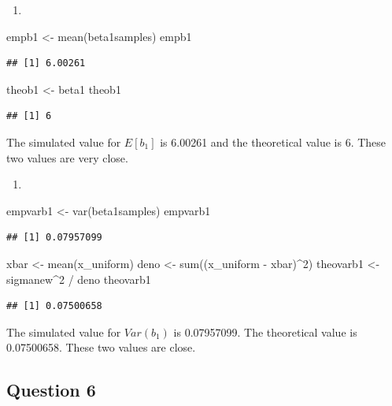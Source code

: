 \documentclass[
]{article}
\newenvironment{Shaded}{\begin{snugshade}}{\end{snugshade}}
\newcommand{\DecValTok}[1]{\textcolor[rgb]{0.00,0.00,0.81}{#1}}
\newcommand{\FunctionTok}[1]{\textcolor[rgb]{0.00,0.00,0.00}{#1}}
\newcommand{\NormalTok}[1]{#1}
\newcommand{\OtherTok}[1]{\textcolor[rgb]{0.56,0.35,0.01}{#1}}
\newcommand{\SpecialCharTok}[1]{\textcolor[rgb]{0.00,0.00,0.00}{#1}}
\providecommand{\tightlist}{%
  \setlength{\itemsep}{0pt}\setlength{\parskip}{0pt}}
\begin{document}
\begin{enumerate}
\def\labelenumi{\alph{enumi}.}
\setcounter{enumi}{1}
\tightlist
\item
\end{enumerate}

\begin{Shaded}
\begin{Highlighting}[]
\NormalTok{empb1 }\OtherTok{\textless{}{-}} \FunctionTok{mean}\NormalTok{(beta1samples)}
\NormalTok{empb1}
\end{Highlighting}
\end{Shaded}

\begin{verbatim}
## [1] 6.00261
\end{verbatim}

\begin{Shaded}
\begin{Highlighting}[]
\NormalTok{theob1 }\OtherTok{\textless{}{-}}\NormalTok{ beta1}
\NormalTok{theob1}
\end{Highlighting}
\end{Shaded}

\begin{verbatim}
## [1] 6
\end{verbatim}

The simulated value for \(E[b_1]\) is 6.00261 and the theoretical value
is 6. These two values are very close.

\begin{enumerate}
\def\labelenumi{\alph{enumi}.}
\setcounter{enumi}{2}
\tightlist
\item
\end{enumerate}

\begin{Shaded}
\begin{Highlighting}[]
\NormalTok{empvarb1 }\OtherTok{\textless{}{-}} \FunctionTok{var}\NormalTok{(beta1samples)}
\NormalTok{empvarb1}
\end{Highlighting}
\end{Shaded}

\begin{verbatim}
## [1] 0.07957099
\end{verbatim}

\begin{Shaded}
\begin{Highlighting}[]
\NormalTok{xbar }\OtherTok{\textless{}{-}} \FunctionTok{mean}\NormalTok{(x\_uniform)}
\NormalTok{deno }\OtherTok{\textless{}{-}} \FunctionTok{sum}\NormalTok{((x\_uniform }\SpecialCharTok{{-}}\NormalTok{ xbar)}\SpecialCharTok{\^{}}\DecValTok{2}\NormalTok{)}
\NormalTok{theovarb1 }\OtherTok{\textless{}{-}}\NormalTok{ sigmanew}\SpecialCharTok{\^{}}\DecValTok{2} \SpecialCharTok{/}\NormalTok{ deno}
\NormalTok{theovarb1}
\end{Highlighting}
\end{Shaded}

\begin{verbatim}
## [1] 0.07500658
\end{verbatim}

The simulated value for \(Var(b_1)\) is 0.07957099. The theoretical
value is 0.07500658. These two values are close.

\hypertarget{question-6}{%
\subsection{Question 6}\label{question-6}}
\end{document}
